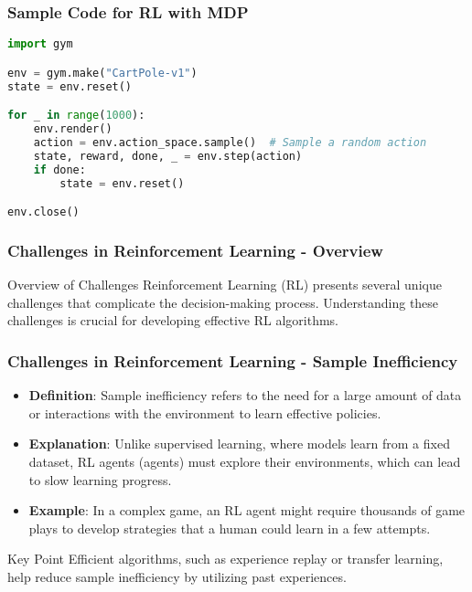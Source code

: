 \documentclass[aspectratio=169]{beamer}
\begin{document}
\begin{frame}[fragile]
    \frametitle{Sample Code for RL with MDP}
    \begin{lstlisting}[language=python]
import gym

env = gym.make("CartPole-v1")
state = env.reset()

for _ in range(1000):
    env.render()
    action = env.action_space.sample()  # Sample a random action
    state, reward, done, _ = env.step(action)
    if done:
        state = env.reset()

env.close()
    \end{lstlisting}
\end{frame}

\begin{frame}[fragile]
    \frametitle{Challenges in Reinforcement Learning - Overview}
    \begin{block}{Overview of Challenges}
        Reinforcement Learning (RL) presents several unique challenges that complicate the decision-making process. 
        Understanding these challenges is crucial for developing effective RL algorithms.
    \end{block}
\end{frame}

\begin{frame}[fragile]
    \frametitle{Challenges in Reinforcement Learning - Sample Inefficiency}
    \begin{itemize}
        \item \textbf{Definition}: Sample inefficiency refers to the need for a large amount of data or interactions with the environment to learn effective policies.
        \item \textbf{Explanation}: 
        Unlike supervised learning, where models learn from a fixed dataset, RL agents (agents) must explore their environments, which can lead to slow learning progress.
        \item \textbf{Example}: In a complex game, an RL agent might require thousands of game plays to develop strategies that a human could learn in a few attempts.
    \end{itemize}
    
    \begin{block}{Key Point}
        Efficient algorithms, such as experience replay or transfer learning, help reduce sample inefficiency by utilizing past experiences.
    \end{block}
\end{frame}
\end{document}
